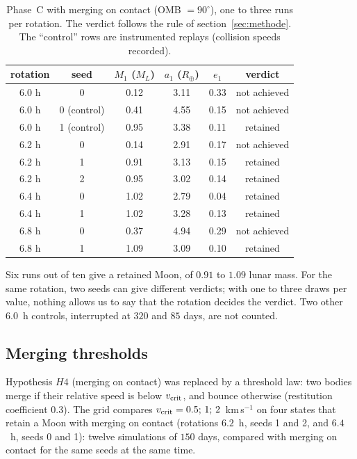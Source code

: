 \documentclass[11pt,a4paper]{article}
\newcommand{\Rt}{\ensuremath{R_\oplus}}
\newcommand{\ML}{\ensuremath{M_L}}
\begin{document}
\begin{table}[htbp]
\centering\small
\caption{Phase~C with merging on contact (OMB $=90^\circ$), one to three runs per rotation. The verdict follows the rule of section~\ref{sec:methode}. The ``control'' rows are instrumented replays (collision speeds recorded).\label{tab:rotscan}}
\begin{tabular}{cccccc}\toprule rotation & seed & $M_1$ ($\ML$) & $a_1$ ($\Rt$) & $e_1$ & verdict\\\midrule
6.0 h & 0 & 0.12 & 3.11 & 0.33 & not achieved\\
6.0 h & 0 (control) & 0.41 & 4.55 & 0.15 & not achieved\\
6.0 h & 1 (control) & 0.95 & 3.38 & 0.11 & retained\\
6.2 h & 0 & 0.14 & 2.91 & 0.17 & not achieved\\
6.2 h & 1 & 0.91 & 3.13 & 0.15 & retained\\
6.2 h & 2 & 0.95 & 3.02 & 0.14 & retained\\
6.4 h & 0 & 1.02 & 2.79 & 0.04 & retained\\
6.4 h & 1 & 1.02 & 3.28 & 0.13 & retained\\
6.8 h & 0 & 0.37 & 4.94 & 0.29 & not achieved\\
6.8 h & 1 & 1.09 & 3.09 & 0.10 & retained\\\bottomrule\end{tabular}
\end{table}

Six runs out of ten give a retained Moon, of $0.91$ to $1.09$ lunar mass. For the same rotation, two seeds can give different verdicts; with one to three draws per value, nothing allows us to say that the rotation decides the verdict. Two other $6.0$~h controls, interrupted at $320$ and $85$ days, are not counted.

\subsection{Merging thresholds}

Hypothesis $H4$ (merging on contact) was replaced by a threshold law: two bodies merge if their relative speed is below $v_{\rm crit}$, and bounce otherwise (restitution coefficient $0.3$). The grid compares $v_{\rm crit}=0.5;\,1;\,2$~km\,s$^{-1}$ on four states that retain a Moon with merging on contact (rotations $6.2$~h, seeds 1 and 2, and $6.4$~h, seeds 0 and 1): twelve simulations of $150$ days, compared with merging on contact for the same seeds at the same time.
\end{document}
